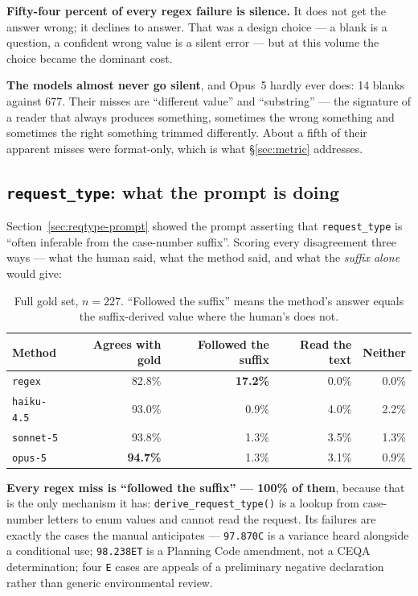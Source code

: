 \documentclass[11pt]{article}
\begin{document}
\textbf{Fifty-four percent of every regex failure is silence.} It does not get the answer
wrong; it declines to answer. That was a design choice --- a blank is a question, a confident
wrong value is a silent error --- but at this volume the choice became the dominant cost.

\textbf{The models almost never go silent}, and Opus~5 hardly ever does: 14 blanks against
677. Their misses are ``different value'' and ``substring'' --- the signature of a reader that
always produces something, sometimes the wrong something and sometimes the right something
trimmed differently. About a fifth of their apparent misses were format-only, which is what
\S\ref{sec:metric} addresses.

\subsection{\texttt{request\_type}: what the prompt is doing}
\label{sec:reqtype}

Section~\ref{sec:reqtype-prompt} showed the prompt asserting that \texttt{request\_type} is
``often inferable from the case-number suffix''. Scoring every disagreement three ways --- what
the human said, what the method said, and what the \emph{suffix alone} would give:

\begin{table}[h]
\centering
\begin{tabular}{lrrrr}
\toprule
Method & Agrees with gold & Followed the suffix & Read the text & Neither \\
\midrule
\texttt{regex}     & 82.8\% & \textbf{17.2\%} & 0.0\% & 0.0\% \\
\texttt{haiku-4.5} & 93.0\% & 0.9\% & 4.0\% & 2.2\% \\
\texttt{sonnet-5}  & 93.8\% & 1.3\% & 3.5\% & 1.3\% \\
\texttt{opus-5}    & \textbf{94.7\%} & 1.3\% & 3.1\% & 0.9\% \\
\bottomrule
\end{tabular}
\caption{Full gold set, $n=227$. ``Followed the suffix'' means the method's answer equals the
suffix-derived value where the human's does not.}
\end{table}

\textbf{Every regex miss is ``followed the suffix'' --- 100\% of them}, because that is the
only mechanism it has: \texttt{derive\_request\_type()} is a lookup from case-number letters
to enum values and cannot read the request. Its failures are exactly the cases the manual
anticipates --- \texttt{97.870C} is a variance heard alongside a conditional use;
\texttt{98.238ET} is a Planning Code amendment, not a CEQA determination; four \texttt{E}
cases are appeals of a preliminary negative declaration rather than generic environmental
review.
\end{document}
